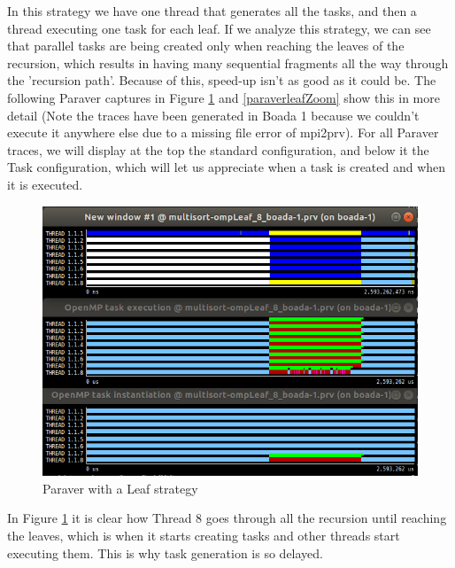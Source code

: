 \documentclass[12]{article}
\begin{document}
In this strategy we have one thread that generates all the tasks, and then a thread executing one task for each leaf. If we analyze this strategy, we can see that parallel tasks are being created only when reaching the leaves of the recursion, which results in having many sequential fragments all the way through the 'recursion path'. Because of this, speed-up isn't as good as it could be. The following Paraver captures in Figure \ref{paraverleaf} and \ref{paraverleafZoom} show this in more detail (Note the traces have been generated in Boada 1 because we couldn't execute it anywhere else due to a missing file error of mpi2prv). For all Paraver traces, we will display at the top the standard configuration, and below it the Task configuration, which will let us appreciate when a task is created and when it is executed.
\\
\medskip
\begin{figure}[H]
    \centering
    \includegraphics[scale=0.75]{images/paraverLeafNoZoom.PNG}
    \caption{Paraver with a Leaf strategy}
    \label{paraverleaf}
\end{figure}
In Figure \ref{paraverleaf} it is clear how Thread 8 goes through all the recursion until reaching the leaves, which is when it starts creating tasks and other threads start executing them. This is why task generation is so delayed.
\end{document}
